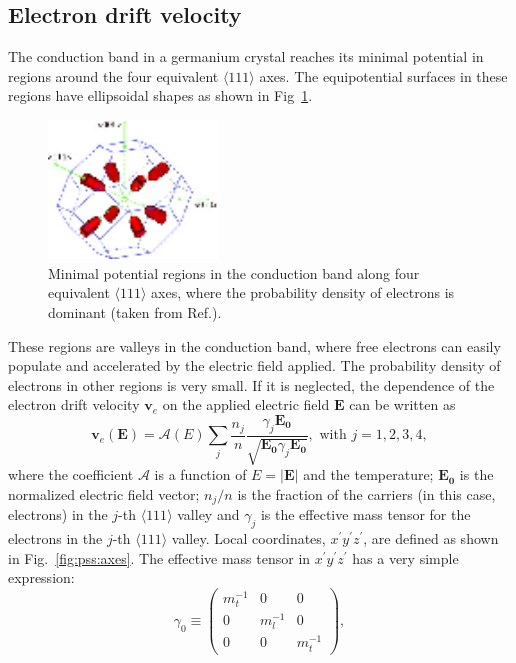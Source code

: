 \subsection{Electron drift velocity}
\label{sec:pss:elec}
The conduction band in a germanium crystal reaches its minimal potential in regions around the four equivalent $\langle 111 \rangle$ axes. The equipotential surfaces in these regions have ellipsoidal shapes as shown in Fig~\ref{fig:pss:valley}. 
\begin{figure}
\centering
\includegraphics[width=0.4\textwidth]{valleys}  
\caption{Minimal potential regions in the conduction band along four equivalent $\langle 111 \rangle$ axes, where the probability density of electrons is dominant (taken from Ref.\cite{bart}).}
\label{fig:pss:valley}
\end{figure}
These regions are valleys in the conduction band, where free electrons can easily populate and accelerated by the electric field applied. The probability density of electrons in other regions is very small. If it is neglected, the dependence of the electron drift velocity $\mathbf{v}_{e}$ on the applied electric field $\mathbf{E}$ can be written as
\begin{equation}
\label{eq:pss:ed}
\mathbf{v}_{e}(\mathbf{E}) = \mathcal{A}(E) \sum_{j} \frac{n_{j}}{n} \frac{\gamma_{j}\mathbf{E_{0}}}{\sqrt{\mathbf{E_{0}}\gamma_{j}\mathbf{E_{0}}}}, \mbox{ with } j=1,2,3,4,
\end{equation}
where the coefficient $\mathcal{A}$ is a function of $E=|\mathbf{E}|$ and the temperature; $\mathbf{E_{0}}$ is the normalized electric field vector; $n_{j}/n$ is the fraction of the carriers (in this case, electrons) in the $j$-th $\langle 111 \rangle$ valley and $\gamma_{j}$ is the effective mass tensor for the electrons in the $j$-th $\langle 111 \rangle$ valley. Local coordinates, $x^{\prime}y^{\prime}z^{\prime}$, are defined as shown in Fig.~\ref{fig:pss:axes}. The effective mass tensor in $x^{\prime}y^{\prime}z^{\prime}$ has a very simple expression:
\begin{equation}
\label{eq:pss:g0}
\gamma_{0} \equiv \left(
\begin{array}{ccc}
m_{t}^{-1} & 0 & 0 \\
0 & m_{l}^{-1} & 0 \\
0 & 0 & m_{t}^{-1}
\end{array} \right),
\end{equation}
